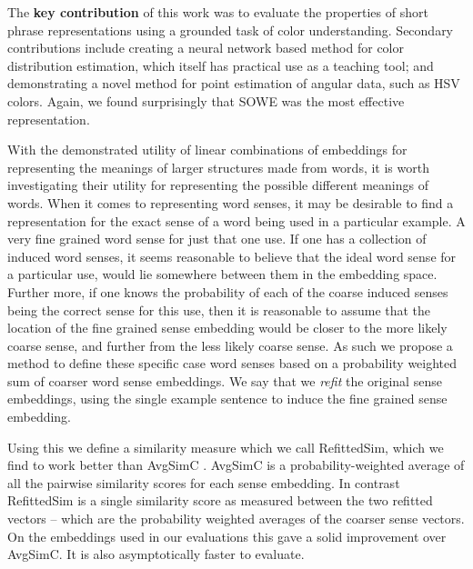 \documentclass{book}
\begin{document}
The \textbf{key contribution} of this work was to evaluate the properties of short phrase representations using a grounded task of color understanding.
Secondary contributions include
creating a neural network based method for color distribution estimation, which itself has practical use as a teaching tool;
and demonstrating a novel method for point estimation of angular data, such as HSV colors.
Again, we found surprisingly that SOWE was the most effective representation.




With the demonstrated utility of linear combinations of embeddings for representing the meanings of larger structures made from words,
it is worth investigating their utility for representing the possible different meanings of words.
When it comes to representing word senses, it may be desirable to find a representation for the exact sense of a word being used in a particular example.
A very fine grained word sense for just that one use.
If one has a collection of induced word senses, it seems reasonable to believe that the ideal word sense for a particular use, would lie somewhere between them in the embedding space.
Further more, if one knows the probability of each of the coarse induced senses being the correct sense for this use,
then it is reasonable to assume that the location of the fine grained sense embedding would be closer to the more likely coarse sense,
and further from the less likely coarse sense.
As such we propose a method to define these specific case word senses based on a probability weighted sum of coarser word sense embeddings.
We say that we \emph{refit} the original sense embeddings, using the single example sentence to induce the fine grained sense embedding.

Using this we define a similarity measure which we call RefittedSim, which we find to work better than AvgSimC \citep{Reisinger2010}.
AvgSimC is a probability-weighted average of all the pairwise similarity scores for each sense embedding.
In contrast RefittedSim is a single similarity score as measured between the two refitted vectors -- which are the probability weighted averages of the coarser sense vectors.
On the embeddings used in our evaluations this gave a solid improvement over AvgSimC.
It is also asymptotically faster to evaluate.
\end{document}
